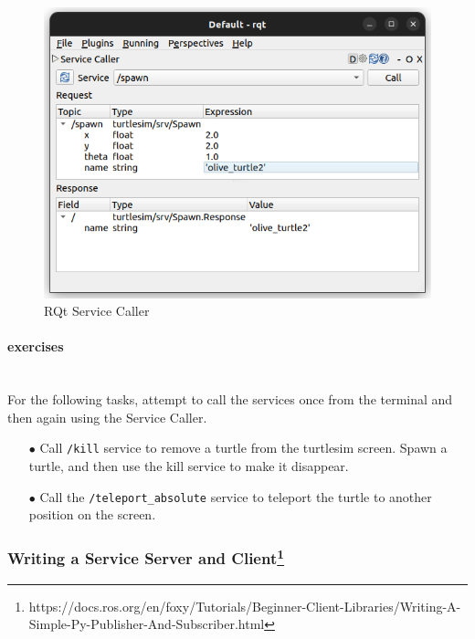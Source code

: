 \documentclass{article}
\begin{document}
\begin{figure}[H]
            \centering
            \includegraphics[width=  \textwidth]{img/Services/service_caller_spawn.png}
            \caption{RQt Service Caller}
\end{figure}

\paragraph{exercises}~\\
For the following tasks, attempt to call the services once from the terminal and then again using the Service Caller.

\begin{enumerate}
    \item[$\bullet$] Call \texttt{/kill} service to remove a turtle from the turtlesim screen. Spawn a turtle, and then use the kill service to make it disappear.

    \item[$\bullet$] Call the \texttt{/teleport\_absolute} service to teleport the turtle to another position on the screen.
\end{enumerate}


\subsubsection[Writing a Service Server and Client]{Writing a Service Server and Client\footnote{https://docs.ros.org/en/foxy/Tutorials/Beginner-Client-Libraries/Writing-A-Simple-Py-Publisher-And-Subscriber.html}}
\end{document}
